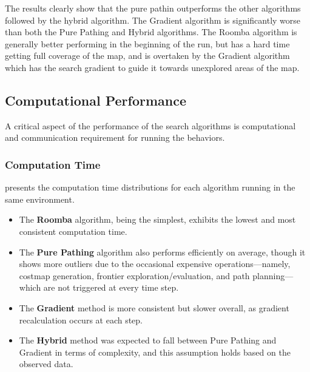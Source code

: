 The results clearly show that the pure pathin outperforms the other algorithms followed by the hybrid algorithm. The Gradient algorithm is significantly worse than both the Pure Pathing and Hybrid algorithms. The Roomba algorithm is generally better performing in the beginning of the run, but has a hard time getting full coverage of the map, and is overtaken by the Gradient algorithm which has the search gradient to guide it towards unexplored areas of the map.


\subsection{Computational Performance}
A critical aspect of the performance of the search algorithms is computational and communication requirement for running the behaviors.

\subsubsection{Computation Time}
 presents the computation time distributions for each algorithm running in the same environment.

\begin{itemize}
  \item The \textbf{Roomba} algorithm, being the simplest, exhibits the lowest and most consistent computation time.
\item The \textbf{Pure Pathing} algorithm also performs efficiently on average, though it shows more outliers due to the occasional expensive operations—namely, costmap generation, frontier exploration/evaluation, and path planning—which are not triggered at every time step.
\item The \textbf{Gradient} method is more consistent but slower overall, as gradient recalculation occurs at each step.
\item The \textbf{Hybrid} method was expected to fall between Pure Pathing and Gradient in terms of complexity, and this assumption holds based on the observed data.
\end{itemize}

